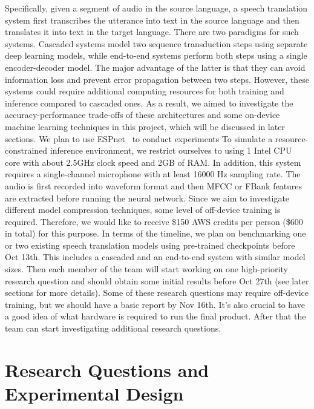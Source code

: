 \documentclass[11pt]{article}
\begin{document}
Specifically, given a segment of audio in the source language, a speech translation system first transcribes the utterance into text in the source language and then translates it into text in the target language. There are two paradigms for such systems. Cascaded systems model two sequence transduction steps using separate deep learning models, while end-to-end systems perform both steps using a single encoder-decoder model. The major advantage of the latter is that they can avoid information loss and prevent error propagation between two steps. However, these systems could require additional computing resources for both training and inference compared to cascaded ones. As a result, we aimed to investigate the accuracy-performance trade-offs of these architectures and some on-device machine learning techniques in this project, which will be discussed in later sections. We plan to use ESPnet~\cite{espnet} to conduct experiments
To simulate a resource-constrained inference environment, we restrict ourselves to using 1 Intel CPU core with about 2.5GHz clock speed and 2GB of RAM. In addition, this system requires a single-channel microphone with at least 16000 Hz sampling rate. The audio is first recorded into waveform format and then MFCC or FBank features are extracted before running the neural network. 
Since we aim to investigate different model compression techniques, some level of off-device training is required. Therefore, we would like to receive \$150 AWS credits per person (\$600 in total) for this purpose.
In terms of the timeline, we plan on benchmarking one or two existing speech translation models using pre-trained checkpoints before Oct 13th. This includes a cascaded and an end-to-end system with similar model sizes. Then each member of the team will start working on one high-priority research question and should obtain some initial results before Oct 27th (see later sections for more details). Some of these research questions may require off-device training, but we should have a basic report by Nov 16th. It’s also crucial to have a good idea of what hardware is required to run the final product. After that the team can start investigating additional research questions.






\section{Research Questions and Experimental Design}
\end{document}
